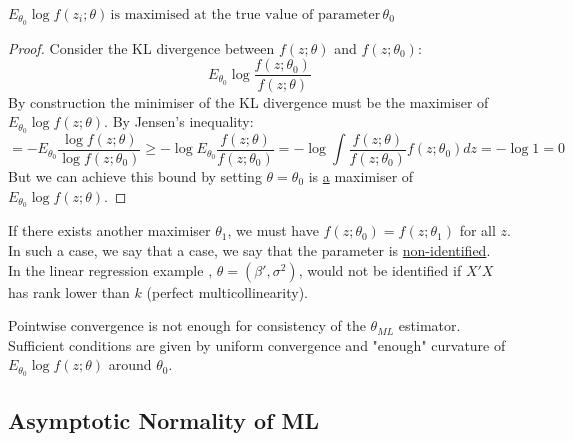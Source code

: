 \documentclass[DIV=14,titlepage=false]{scrreprt}
\begin{document}
\vspace{5mm}
\begin{prop}
    \(E_{\theta_0}\log f(z_i;\theta) \, \text{is maximised at the true value of parameter}\, \theta_0\)
\end{prop}
\vspace{5mm}
\begin{proof}
    Consider the KL divergence between \(f(z;\theta)\) and \(f(z;\theta_0)\):
    \[E_{\theta_0}\log \frac{f(z;\theta_0)}{f(z;\theta)}\]
    By construction the minimiser of the KL divergence must be the maximiser of \(E_{\theta_0}\log f(z;\theta)\).
    By Jensen's inequality:
    \[=-E_{\theta_0}\frac{\log f(z;\theta)}{\log f(z;\theta_0)}\geq-\log E_{\theta_0}\frac{ f(z;\theta)}{f(z;\theta_0)}=-\log\int\frac{f(z;\theta)}{f(z;\theta_0)}f(z;\theta_0)dz=-\log 1 = 0\]
    But we can achieve this bound by setting \(\theta=\theta_0\) is \underline{a} maximiser of \(E_{\theta_0}\log f(z;\theta)\). 
\end{proof}

\begin{note}
If there exists another maximiser \(\theta_1\), we must have \(f(z;\theta_0)=f(z;\theta_1)\) for all \(z\).
In such a case, we say that a case, we say that the parameter is \underline{non-identified}.
\\
In the linear regression example , \(\theta=(\beta',\sigma^2)\), would not be identified if \(X'X\) has rank lower than \(k\) (perfect multicollinearity).

Pointwise convergence is not enough for consistency of the \(\theta_{ML}\) estimator. Sufficient conditions are given by uniform convergence and "enough" curvature of \(E_{\theta_0}\log f(z;\theta)\) around \(\theta_0\).
\end{note}

\subsection{Asymptotic Normality of ML}
\end{document}
